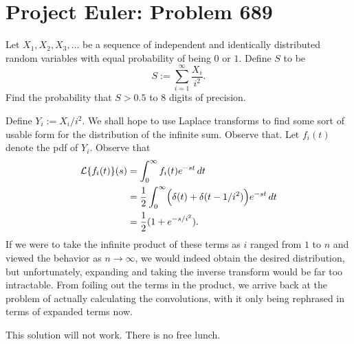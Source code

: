 \documentclass[a4paper, 12pt]{article}
\begin{document}
\section*{Project Euler: Problem 689}

\begin{chirpbox}
    \begin{problem}
        Let \( X_1, X_2, X_3, \ldots \) be a sequence of independent and identically distributed random variables with equal probability of being \( 0 \) or \( 1 \). Define \( S \) to be
        \[
            S := \sum_{i = 1}^{\infty} \frac{X_i}{i^2}
        .\]
        Find the probability that \( S > 0.5 \) to \( 8 \) digits of precision.
    \end{problem}
\end{chirpbox}

\begin{solution}[\textcolor{red}{Laplace Transforms}]
    Define \( Y_i := X_i / i^2 \). We shall hope to use Laplace transforms to find some sort of usable form for the distribution of the infinite sum. Observe that. Let \( f_i(t) \) denote the pdf of \( Y_i \). Observe that
    \begin{align*}
        \mathcal{L} \{ f_i (t) \}(s) &= \int_{0}^{\infty} f_i(t) e^{-st} \, dt \\
        &= \frac{1}{2} \int_{0}^{\infty} \Bigl( \delta (t) + \delta(t - 1/i^2) \Bigr) e^{-st} \, dt \\
        &= \frac{1}{2} ( 1 + e^{-s/i^2} )
    .\end{align*}
    If we were to take the infinite product of these terms as \( i \) ranged from \( 1 \) to \( n \) and viewed the behavior as \( n \to \infty \), we would indeed obtain the desired distribution, but unfortunately, expanding and taking the inverse transform would be far too intractable. From foiling out the terms in the product, we arrive back at the problem of actually calculating the convolutions, with it only being rephrased in terms of expanded terms now.

    This solution will not work. There is no free lunch.
\end{solution}
\end{document}
